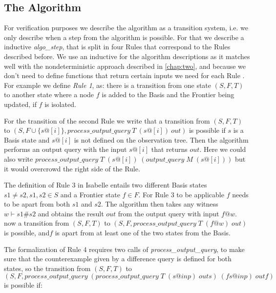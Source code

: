 \subsection{The Algorithm}
For verification purposes we describe the algorithm as a transition system, i.e. we only describe when a step from the algorithm is possible. For that we describe a inductive \textit{algo\_step}, that is split in four Rules that correspond to the Rules described before. We use an inductive for the algorithm descriptions as it matches well with the nondeterministic approach described in \autoref{chap:two}, and because we don't need to define functions that return certain inputs we need for each Rule . For example we define \textit{Rule 1}, as: there is a transition from one state $(S,F,T)$ to another state where a node $f$ is added to the Basis and the Frontier being updated, if $f$ is isolated.
\begin{myisabelle}
\end{myisabelle}
For the transition of the second Rule we write that a transition from $(S,F,T)$ to $(S,F\cup\{s@[i]\},process\_output\_query\: T\: (s@[i])\: out)$ is possible if $s$ is a Basis state and $s@[i]$ is not defined on the observation tree. Then the algorithm performs an output query with the input $s@[i]$ that returns $out$. Here we could also write $process\_output\_query\; T\; (s@[i])\; (output\_query\; M\; (s@[i]) )$ but it would overcrowd the right side of the Rule. 
\begin{myisabelle}
\end{myisabelle}
The definition of Rule 3 in Isabelle entails two different Basis states $s1\neq s2, s1,s2\in S$ and a Frontier state $f\in F$. For Rule 3 to be applicable $f$ needs to be apart from both $s1$ and $s2$. The algorithm then takes any witness $w\vdash s1\# s2$ and obtains the result $out$ from the output query with input $f@w$. now a transition from $(S,F,T)$ to $(S,F,process\_output\_query\; T\; (f@w)\; out)$ is possible, and$f$ is apart from at least one of the two states from the Basis. 
\begin{myisabelle}
\end{myisabelle}
The formalization of Rule 4 requires two calls of \textit{process\_output\_query}, to make sure that the counterexample given by a difference query is defined for both states, so the transition from $(S,F,T)$ to \newline$(S,F,process\_output\_query\; (process\_output\_query \; T \; (s@inp)\; outs) \; (fs@inp)\;outf)$ is possible if:
